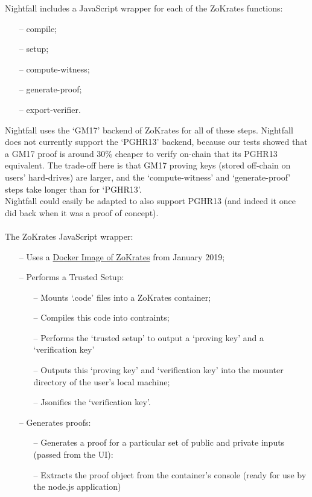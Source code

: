 \documentclass{article}
\begin{document}
Nightfall includes a JavaScript wrapper for each of the ZoKrates functions:
\begin{itemize} \itemsep-0.5em
  \item[--] compile;
  \item[--] setup;
  \item[--] compute-witness;
  \item[--] generate-proof;
  \item[--] export-verifier.
\end{itemize}

\noindent
Nightfall uses the `GM17' backend of ZoKrates for all of these steps. Nightfall does not currently support the `PGHR13' backend, because our tests showed that a GM17 proof is around 30\% cheaper to verify on-chain that its PGHR13 equivalent. The trade-off here is that GM17 proving keys (stored off-chain on users' hard-drives) are larger, and the `compute-witness' and `generate-proof' steps take longer than for `PGHR13'.\\
Nightfall could easily be adapted to also support PGHR13 (and indeed it once did back when it was a proof of concept).\\
\\
The ZoKrates JavaScript wrapper:
\begin{itemize} \itemsep-0.5em
  \item[--] Uses a \href{https://hub.docker.com/r/michaelconnor/zok}{Docker Image of ZoKrates} from January 2019;
  \item[--] Performs a Trusted Setup:
  \begin{itemize}
    \item[--] Mounts `.code' files into a ZoKrates container;
    \item[--] Compiles this code into contraints;
    \item[--] Performs the `trusted setup' to output a `proving key' and a `verification key'
    \item[--] Outputs this `proving key' and `verification key' into the mounter directory of the user's local machine;
    \item[--] Jsonifies the `verification key'.
  \end{itemize}
  \item[--] Generates proofs:
  \begin{itemize}
    \item[--] Generates a proof for a particular set of public and private inputs (passed from the UI):
    \item[--] Extracts the proof object from the container's console (ready for use by the node.js application)
  \end{itemize}
\end{itemize}
\end{document}
